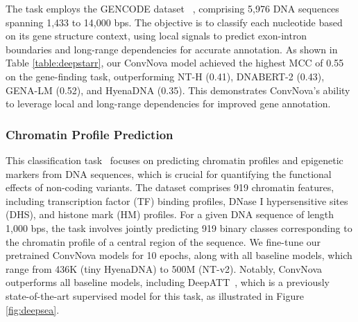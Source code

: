The task employs the GENCODE dataset ~\citep{harrow2012gencode}, comprising 5,976 DNA sequences spanning 1,433 to 14,000 bps. The objective is to classify each nucleotide based on its gene structure context, using local signals to predict exon-intron boundaries and long-range dependencies for accurate annotation. As shown in Table \ref{table:deepstarr}, our ConvNova model achieved the highest MCC of 0.55 on the gene-finding task, outperforming NT-H (0.41), DNABERT-2 (0.43), GENA-LM (0.52), and HyenaDNA (0.35). This demonstrates ConvNova's ability to leverage local and long-range dependencies for improved gene annotation.


\subsubsection{Chromatin Profile Prediction}
This classification task~\citep{zhou2015predicting}  focuses on predicting chromatin profiles and epigenetic markers from DNA sequences, which is crucial for quantifying the functional effects of non-coding variants. The dataset comprises 919 chromatin features, including transcription factor (TF) binding profiles, DNase I hypersensitive sites (DHS), and histone mark (HM) profiles. For a given DNA sequence of length 1,000 bps, the task involves jointly predicting 919 binary classes corresponding to the chromatin profile of a central region of the sequence. We fine-tune our pretrained ConvNova models for 10 epochs, along with all baseline models, which range from 436K (tiny HyenaDNA) to 500M (NT-v2). Notably, ConvNova outperforms all baseline models, including DeepATT~\citep{li2021deepatt}, which is a previously state-of-the-art supervised model for this task, as illustrated in Figure \ref{fig:deepsea}.


